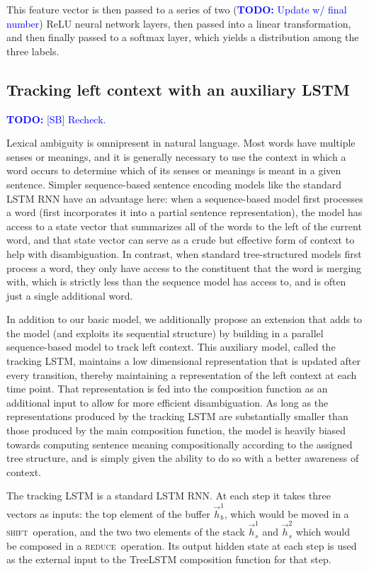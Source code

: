 \documentclass[11pt,letterpaper]{article}
\newcommand\todo[1]{\textcolor{blue}{\textbf{TODO:} #1}}
\newcommand{\shift}{\textsc{shift}}
\newcommand{\reduce}{\textsc{reduce}}
\begin{document}
This feature vector is then passed to a series of two (\todo{Update w/ final number}) ReLU neural network layers, then passed into a linear transformation, and then finally passed to a softmax layer, which yields a distribution among the three labels.

\subsection{Tracking left context with an auxiliary LSTM} \todo{[SB] Recheck.}

Lexical ambiguity is omnipresent in natural language. Most words have multiple senses or meanings, and it is generally necessary to use the context in which a word occurs to determine which of its senses or meanings is meant in a given sentence. Simpler sequence-based sentence encoding models like the standard LSTM RNN have an advantage here: when a sequence-based model first processes a word (first incorporates it into a partial sentence representation), the model has access to a state vector that summarizes all of the words to the left of the current word, and that state vector can serve as a crude but effective form of context to help with disambiguation. In contrast, when standard tree-structured models first process a word, they only have access to the constituent that the word is merging with, which is strictly less than the sequence model has access to, and is often just a single additional word. 

In addition to our basic model, we additionally propose an extension that adds to the model (and exploits its sequential structure) by building in a parallel sequence-based model to track left context. This auxiliary model, called the tracking LSTM, maintains a low dimensional representation that is updated after every transition, thereby maintaining a representation of the left context at each time point. That representation is fed into the composition function as an additional input to allow for more efficient disambiguation. As long as the representations produced by the tracking LSTM are substantially smaller than those produced by the main composition function, the model is heavily biased towards computing sentence meaning compositionally according to the assigned tree structure, and is simply given the ability to do so with a better awareness of context.

The tracking LSTM is a standard LSTM RNN. At each step it takes three vectors as inputs: the top element of the buffer $\vec{h}_b^1$, which would be moved in a \shift~operation, and the two two elements of the stack $\vec{h}_s^1$ and $\vec{h}_s^2$ which would be composed in a \reduce~operation. Its output hidden state at each step is used as the external input to the TreeLSTM composition function for that step.
\end{document}
